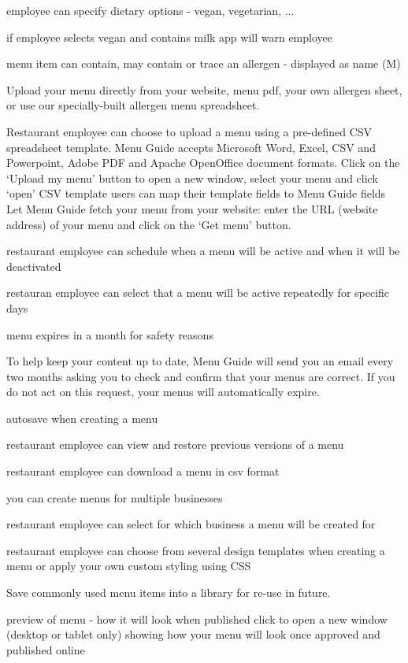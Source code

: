   employee can specify dietary options - vegan, vegetarian, ...

  if employee selects vegan and contains milk app will warn employee
  
  menu item can contain, may contain or trace an allergen - displayed as name (M)

  Upload your menu directly from your website, menu pdf, your own allergen sheet, or use our specially-built allergen menu spreadsheet. 

  Restaurant employee can choose to upload a menu using a pre-defined CSV spreadsheet template.
  Menu Guide accepts Microsoft Word, Excel, CSV and Powerpoint, Adobe PDF and Apache
  OpenOffice document formats. Click on the ‘Upload my menu’ button to open a new
  window, select your menu and click ‘open’
  CSV template users can map their template fields to Menu Guide fields
  Let Menu Guide fetch your menu from your website: enter the URL (website address) of your menu and click on the ‘Get menu’ button.

  restaurant employee can schedule when a menu will be active and when it will be deactivated

  restauran employee can select that a menu will be active repeatedly for specific days

  menu expires in a month for safety reasons

  To help keep your content up to date, Menu Guide will send you an email every two months asking you
  to check and confirm that your menus are correct. If you do not act on this request, your menus will
  automatically expire.

  autosave when creating a menu

  restaurant employee can view and restore previous versions of a menu 

  restaurant employee can download a menu in csv format

  you can create menus for multiple businesses

  restaurant employee can select for which business a menu will be created for

  restaurant employee can choose from several design templates when creating a menu or apply your own custom styling using CSS

  Save commonly used menu items into a library for re-use in future.

  preview of menu - how it will look when published
  click to open a new window (desktop or tablet only) showing how your menu will look once approved and published online 

